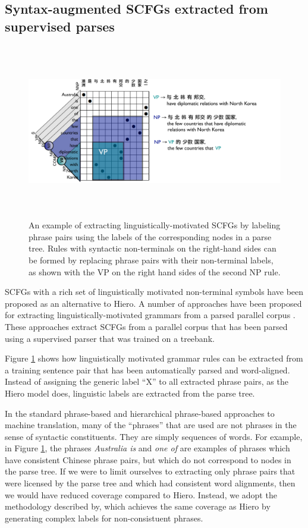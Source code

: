 \subsection{Syntax-augmented SCFGs extracted from supervised parses}\label{samt}


\begin{figure}
\begin{center}
\includegraphics[height=3in]{SCFGs/scfg-phrase-extraction.pdf}
\end{center}
\caption{An example of extracting linguistically-motivated SCFGs by labeling phrase pairs using the labels of the corresponding nodes in a parse tree.  Rules with syntactic non-terminals on the right-hand sides can be formed by replacing  phrase pairs with their non-terminal labels, as shown with the VP on the right hand sides of the second NP rule.}\label{scfg-phrase-extraction}
\end{figure}


SCFGs with a rich set of linguistically motivated non-terminal symbols have been proposed as an alternative to Hiero. A number of approaches have been proposed for extracting linguistically-motivated grammars from a parsed parallel corpus \cite{Galley2004,samt}.   These approaches extract SCFGs from a parallel corpus that has been parsed using a supervised parser that was trained on a treebank.  

Figure \ref{scfg-phrase-extraction} shows how linguistically motivated grammar rules can be extracted from a training sentence pair that has been automatically parsed and word-aligned.    Instead of assigning the generic label ``X'' to all extracted phrase pairs, as the Hiero model does, linguistic labels are extracted from the parse tree.   

In the standard phrase-based and hierarchical phrase-based approaches to machine translation, many of the ``phrases'' that are used are not phrases in the sense of syntactic constituents.  They are simply sequences of words.  For example, in Figure \ref{scfg-phrase-extraction}, the phrases {\it Australia is} and {\it one of} are examples of phrases which have consistent Chinese phrase pairs, but which do not correspond to nodes in the parse tree.  If we were to limit ourselves to extracting only phrase pairs that were licensed by the parse tree and which had consistent word alignments, then we would have reduced coverage compared to Hiero.  Instead, we adopt the methodology described by\citet{samt}, which achieves the same coverage as Hiero by generating complex labels for non-consistuent phrases.  


